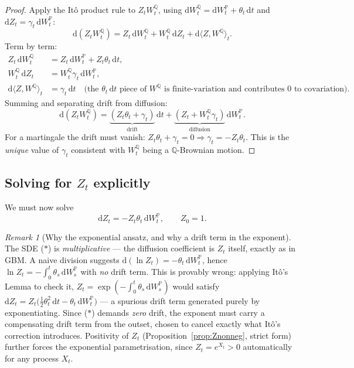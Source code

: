 \documentclass[11pt]{article}
\theoremstyle{definition}
\theoremstyle{remark}
\newtheorem{remark}[theorem]{Remark}
\newcommand{\dd}{\mathrm{d}}
\renewcommand{\P}{\mathbb{P}}
\newcommand{\Q}{\mathbb{Q}}
\begin{document}
\begin{proof}
Apply the Itô product rule to $Z_tW_t^\Q$, using $\dd W_t^\Q = \dd W_t^\P + \theta_t\,\dd t$ and
$\dd Z_t = \gamma_t\,\dd W_t^\P$:
\[
\dd(Z_tW_t^\Q) = Z_t\,\dd W_t^\Q + W_t^\Q\,\dd Z_t + \dd\langle Z, W^\Q\rangle_t.
\]
Term by term:
\begin{align*}
Z_t\,\dd W_t^\Q &= Z_t\,\dd W_t^\P + Z_t\theta_t\,\dd t, \\
W_t^\Q\,\dd Z_t &= W_t^\Q\gamma_t\,\dd W_t^\P, \\
\dd\langle Z, W^\Q\rangle_t &= \gamma_t\,\dd t \quad\text{(the $\theta_t\,\dd t$ piece of $W^\Q$ is finite-variation and contributes 0 to covariation).}
\end{align*}
Summing and separating drift from diffusion:
\[
\dd(Z_tW_t^\Q) = \underbrace{(Z_t\theta_t+\gamma_t)}_{\text{drift}}\,\dd t
+ \underbrace{(Z_t + W_t^\Q\gamma_t)}_{\text{diffusion}}\,\dd W_t^\P.
\]
For a martingale the drift must vanish: $Z_t\theta_t + \gamma_t = 0 \Rightarrow \gamma_t = -Z_t\theta_t$.
This is the \emph{unique} value of $\gamma_t$ consistent with $W_t^\Q$ being a $\Q$-Brownian motion.
\end{proof}

\subsection{Solving for $Z_t$ explicitly}

We must now solve
\[
\dd Z_t = -Z_t\theta_t\,\dd W_t^\P, \qquad Z_0 = 1. \tag{$\ast$}
\]

\begin{remark}[Why the exponential ansatz, and why a drift term in the exponent]
The SDE ($\ast$) is \emph{multiplicative} — the diffusion coefficient is $Z_t$ itself, exactly as in
GBM. A naive division suggests $\dd(\ln Z_t) = -\theta_t\,\dd W_t^\P$, hence
$\ln Z_t = -\int_0^t\theta_s\,\dd W_s^\P$ with \emph{no} drift term. This is provably wrong: applying
Itô's Lemma to check it, $Z_t = \exp\!\left(-\int_0^t\theta_s\,\dd W_s^\P\right)$ would satisfy
$\dd Z_t = Z_t\big(\tfrac12\theta_t^2\,\dd t - \theta_t\,\dd W_t^\P\big)$ — a spurious drift term
generated purely by exponentiating. Since ($\ast$) demands \emph{zero} drift, the exponent must
carry a compensating drift term from the outset, chosen to cancel exactly what Itô's correction
introduces. Positivity of $Z_t$ (Proposition~\ref{prop:Znonneg}, strict form) further forces the
exponential parametrisation, since $Z_t=e^{X_t}>0$ automatically for any process $X_t$.
\end{remark}
\end{document}
